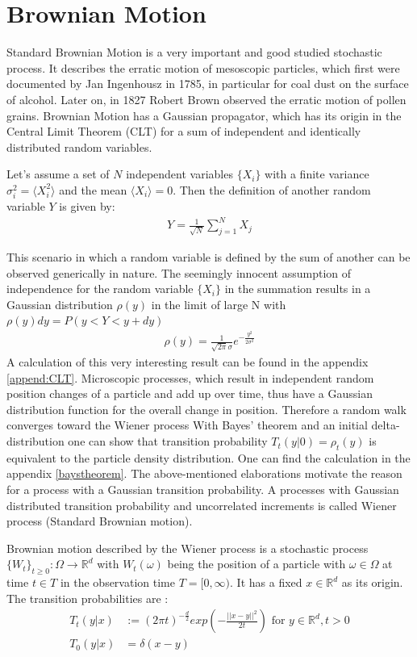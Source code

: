 \documentclass[
  a4paper,BCOR10mm,oneside,
  bibtotoc,idxtotoc,
  headsepline,footsepline,%
  fleqn,openbib
]{scrbook}
\begin{document}
\section{Brownian Motion}
Standard Brownian Motion is a very important and good studied stochastic process. It describes the erratic motion of mesoscopic particles, which first were documented by Jan Ingenhousz in 1785, in particular for coal dust on the surface of alcohol\cite{Hofling2013}. Later on, in 1827 Robert Brown observed the erratic motion of pollen grains. Brownian Motion has a Gaussian propagator, which has its origin in the Central Limit Theorem (CLT) for a sum of independent and identically distributed random variables.
\begin{mydef} 
Let's assume a set of $N$ independent variables $\{X_i\}$ with a finite variance $ \sigma_i^2=\langle X_{i}^2\rangle $ and the mean $\langle X_{i}\rangle = 0$. Then the definition of another random variable $Y$ is given by:
 \begin{align}
  Y = \frac{1}{\sqrt{N}} \sum_{j=1}^N X_j \label{eq:CLT}
 \end{align}
\end{mydef}
This scenario in which a random variable is defined by the sum of another can be observed generically in nature. The seemingly innocent assumption of independence for the random variable $\{X_i\}$ in the summation results in a Gaussian distribution $\rho(y)$ in the limit of large N with $\rho(y)dy=P(y<Y<y+dy)$ 
\begin{align}
 \rho(y) =\frac{1}{\sqrt{2 \pi} \sigma } e^{-\frac{y^2}{2 \sigma^2}}
\end{align}
A calculation of this very interesting result can be found in the appendix \ref{append:CLT}.    Microscopic processes, which result in independent random position changes of a particle and add up over time, thus have a Gaussian distribution function for the overall change in position. Therefore a random walk converges toward the Wiener process \newline With  Bayes' theorem and an initial delta-distribution one can show that transition probability $T_{t}(y|0) = \rho_{t}(y)$ is equivalent to the particle density distribution. One can find the calculation in the appendix \ref{baystheorem}. The above-mentioned elaborations motivate the reason for a process with a Gaussian transition probability. A processes with Gaussian distributed transition probability and uncorrelated increments is called Wiener process (Standard Brownian motion).
\begin{mydef}
Brownian motion described by the Wiener process is a stochastic process $ \{ W_t \}_{t\geq0}: \Omega \rightarrow \mathbb{R}^d$ with $ W_t(\omega)$ being the position of a particle with $\omega \in \Omega$ at time $t \in T$ in the observation time $T =[0, \infty)$. It has a fixed $x \in \mathbb{R}^d$ as its origin. The transition probabilities are \cite{LectureFelix}: 
\begin{align}
T_{t}(y|x) & := (2 \pi t)^{- \frac{d}{2}} exp \left(- \frac{||x-y||^2}{2 t}\right) \text{ for } y \in \mathbb{R}^d, t>0 \\ \nonumber
T_{0}(y|x) & = \delta(x-y) 
\end{align}
\end{mydef}
\end{document}
